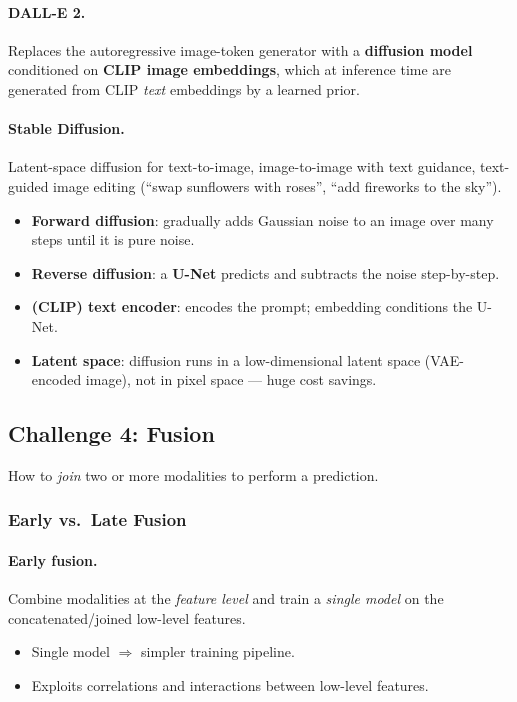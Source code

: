 \documentclass[11pt,a4paper]{article}
\theoremstyle{definition}
\theoremstyle{plain}
\theoremstyle{remark}
\begin{document}
\paragraph{DALL-E 2.} Replaces the autoregressive image-token generator with a \textbf{diffusion model} conditioned on \textbf{CLIP image embeddings}, which at inference time are generated from CLIP \emph{text} embeddings by a learned prior.

\paragraph{Stable Diffusion.} Latent-space diffusion for text-to-image, image-to-image with text guidance, text-guided image editing (``swap sunflowers with roses'', ``add fireworks to the sky'').

\begin{tcolorbox}[colback=yellow!5!white, colframe=orange!80!black, title={Stable Diffusion components (recap)}]
\begin{itemize}
    \item \textbf{Forward diffusion}: gradually adds Gaussian noise to an image over many steps until it is pure noise.
    \item \textbf{Reverse diffusion}: a \textbf{U-Net} predicts and subtracts the noise step-by-step.
    \item \textbf{(CLIP) text encoder}: encodes the prompt; embedding conditions the U-Net.
    \item \textbf{Latent space}: diffusion runs in a low-dimensional latent space (VAE-encoded image), not in pixel space --- huge cost savings.
\end{itemize}
\end{tcolorbox}

\subsection{Challenge 4: Fusion}

How to \emph{join} two or more modalities to perform a prediction.

\subsubsection{Early vs.\ Late Fusion}

\paragraph{Early fusion.} Combine modalities at the \emph{feature level} and train a \emph{single model} on the concatenated/joined low-level features.
\begin{itemize}
    \item[+] Single model $\Rightarrow$ simpler training pipeline.
    \item[+] Exploits correlations and interactions between low-level features.
\end{itemize}
\end{document}
